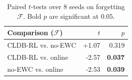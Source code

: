 \begin{table}[t]\centering\small
\caption{Paired $t$-tests over 8 seeds on forgetting $\mathcal{F}$. Bold $p$ are significant at $0.05$.}
\label{tab:sig}
\begin{tabular}{lrr}
\toprule
Comparison ($\mathcal{F}$) & $t$ & $p$ \\
\midrule
CLDB-RL vs. no-EWC & +1.07 & 0.319 \\
CLDB-RL vs. online & -2.57 & \textbf{0.037} \\
no-EWC vs. online & -2.53 & \textbf{0.039} \\
\bottomrule\end{tabular}\end{table}
